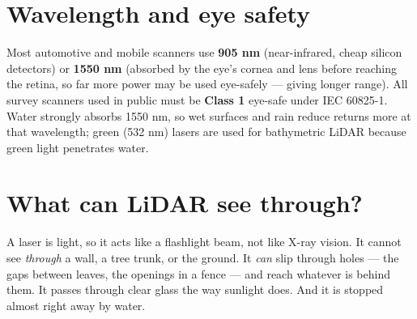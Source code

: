 \section{Wavelength and eye safety}
\begin{eng}
Most automotive and mobile scanners use \textbf{905 nm} (near-infrared, cheap silicon detectors) or \textbf{1550 nm} (absorbed by the eye's cornea and lens before reaching the retina, so far more power may be used eye-safely --- giving longer range). All survey scanners used in public must be \textbf{Class 1} eye-safe under IEC 60825-1. Water strongly absorbs 1550 nm, so wet surfaces and rain reduce returns more at that wavelength; green (532 nm) lasers are used for bathymetric LiDAR because green light penetrates water.
\end{eng}

\section{What can LiDAR see through?}
\begin{kid}
A laser is light, so it acts like a flashlight beam, not like X-ray vision. It cannot see \emph{through} a wall, a tree trunk, or the ground. It \emph{can} slip through holes --- the gaps between leaves, the openings in a fence --- and reach whatever is behind them. It passes through clear glass the way sunlight does. And it is stopped almost right away by water.
\end{kid}


